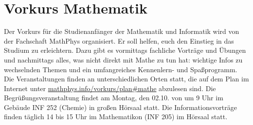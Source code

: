 \section{Vorkurs Mathematik}
Der Vorkurs für die Studienanfänger der Mathematik und Informatik wird von der Fachschaft MathPhys organisiert. Er soll helfen, euch den Einstieg in das Studium zu erleichtern. Dazu gibt es vormittags fachliche Vorträge und Übungen und nachmittags alles, was nicht direkt mit Mathe zu tun hat: wichtige Infos zu wechselnden Themen und ein umfangreiches Kennenlern- und Spaßprogramm.
Die Veranstaltungen finden an unterschiedlichen Orten statt, die auf dem Plan im Internet  unter \url{mathphys.info/vorkurs/plan\#mathe} abzulesen sind. Die Begrüßungsveranstaltung findet am Montag, den 02.10. von um 9 Uhr im Gebäude \gls{INF} 252 (Chemie) in großen Hörsaal statt. Die Informationsvorträge finden täglich 14 bis 15 Uhr im Mathematikon (\gls{INF} 205) im Hörsaal statt.
